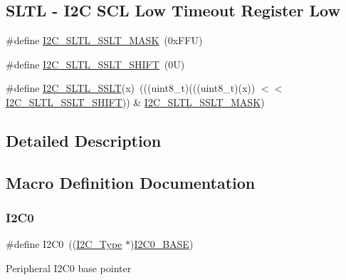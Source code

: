 \subsection*{S\+L\+TL -\/ I2C S\+CL Low Timeout Register Low}
\begin{DoxyCompactItemize}
\item 
\#define \mbox{\hyperlink{group___i2_c___register___masks_gac29118698aa1c246c26835a19210a0c9}{I2\+C\+\_\+\+S\+L\+T\+L\+\_\+\+S\+S\+L\+T\+\_\+\+M\+A\+SK}}~(0x\+F\+F\+U)
\item 
\#define \mbox{\hyperlink{group___i2_c___register___masks_ga177f38e09f29a382b35b19906462204f}{I2\+C\+\_\+\+S\+L\+T\+L\+\_\+\+S\+S\+L\+T\+\_\+\+S\+H\+I\+FT}}~(0\+U)
\item 
\#define \mbox{\hyperlink{group___i2_c___register___masks_gab7bec69c829adac299ed11bd66411507}{I2\+C\+\_\+\+S\+L\+T\+L\+\_\+\+S\+S\+LT}}(x)~(((uint8\+\_\+t)(((uint8\+\_\+t)(x)) $<$$<$ \mbox{\hyperlink{group___i2_c___register___masks_ga177f38e09f29a382b35b19906462204f}{I2\+C\+\_\+\+S\+L\+T\+L\+\_\+\+S\+S\+L\+T\+\_\+\+S\+H\+I\+FT}})) \& \mbox{\hyperlink{group___i2_c___register___masks_gac29118698aa1c246c26835a19210a0c9}{I2\+C\+\_\+\+S\+L\+T\+L\+\_\+\+S\+S\+L\+T\+\_\+\+M\+A\+SK}})
\end{DoxyCompactItemize}


\subsection{Detailed Description}


\subsection{Macro Definition Documentation}
\mbox{\label{group___i2_c___register___masks_ga86abb2e8858d177c04e60c41e9242045}} 
\subsubsection{\texorpdfstring{I2\+C0}{I2C0}}
{\footnotesize\ttfamily \#define I2\+C0~((\mbox{\hyperlink{struct_i2_c___type}{I2\+C\+\_\+\+Type}} $\ast$)\mbox{\hyperlink{group___i2_c___register___masks_gabf0928baf4e4350633ca9050b65d1939}{I2\+C0\+\_\+\+B\+A\+SE}})}

Peripheral I2\+C0 base pointer \mbox{\label{group___i2_c___register___masks_gabf0928baf4e4350633ca9050b65d1939}} 
